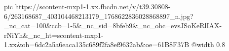 
 
 
 
 

\ifcmt
  pic https://scontent-mxp1-1.xx.fbcdn.net/v/t39.30808-6/263168687_403104468213179_1768622836028868897_n.jpg?_nc_cat=100&ccb=1-5&_nc_sid=8bfeb9&_nc_ohc=evsJSoKeRlIAX-rNiYh&_nc_ht=scontent-mxp1-1.xx&oh=6dc2a5a6eaca135c689f2fa8ef9632ab&oe=61B8F37B
  @width 0.8
\fi

